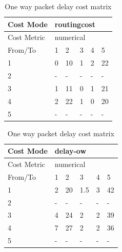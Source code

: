\begin{table}[H]
    \centering
    \begin{subtable}{.46\linewidth}
        \centering
        \begin{tabular}{|l|l|l|l|l|l|}
        \hline
        Cost Mode   & \multicolumn{5}{|l|}{routingcost} \\ \hline
        Cost Metric & \multicolumn{5}{|l|}{numerical}   \\ \hline
        From/To     & 1    & 2     & 3   & 4   & 5      \\ \hline
        1           & 0    & 10    & 1   & 2   & 22     \\ \hline
        2           & -    & -     & -   & -   & -      \\ \hline
        3           & 1    & 11    & 0   & 1   & 21     \\ \hline
        4           & 2    & 22    & 1   & 0   & 20     \\ \hline
        5           & -    & -     & -   & -   & -      \\ \hline
        \end{tabular}
    \caption{Routing cost cost matrix}
    \label{table:cost-generic}
    \end{subtable}
    \begin{subtable}{.46\linewidth}
        \centering
        \begin{tabular}{|l|l|l|l|l|l|}
        \hline
        Cost Mode   & \multicolumn{5}{|l|}{delay-ow}    \\ \hline
        Cost Metric & \multicolumn{5}{|l|}{numerical}   \\ \hline
        From/To     & 1    & 2     & 3   & 4   & 5      \\ \hline
        1           & 2    & 20    & 1.5 & 3   & 42     \\ \hline
        2           & -    & -     & -   & -   & -      \\ \hline
        3           & 4    & 24    & 2   & 2   & 39     \\ \hline
        4           & 7    & 27    & 2   & 2   & 36     \\ \hline
        5           & -    & -     & -   & -   & -      \\ \hline
        \end{tabular}
    \caption{One way packet delay cost matrix}
    \label{table:cost-delay}
    \end{subtable}
    \begin{subtable}{.65\linewidth}

\end{subtable}
\end{table}
